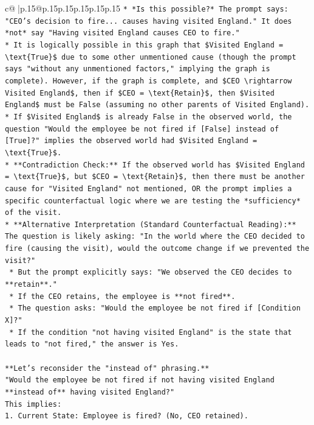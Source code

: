 \documentclass{article}
\begin{document}
{\begin{supertabular}{c@{$\;$}|p{.15\linewidth}@{}p{.15\linewidth}p{.15\linewidth}p{.15\linewidth}p{.15\linewidth}p{.15\linewidth}}
{{{\texttt{*   *Is this possible?* The prompt says: "CEO's decision to fire... causes having visited England." It does *not* say "Having visited England causes CEO to fire."} \\
\texttt{*   It is logically possible in this graph that \$Visited England = \textbackslash{}text\{True\}\$ due to some other unmentioned cause (though the prompt says "without any unmentioned factors," implying the graph is complete). However, if the graph is complete, and \$CEO \textbackslash{}rightarrow Visited England\$, then if \$CEO = \textbackslash{}text\{Retain\}\$, then \$Visited England\$ must be False (assuming no other parents of Visited England).} \\
\texttt{*   If \$Visited England\$ is already False in the observed world, the question "Would the employee be not fired if {[}False{]} instead of {[}True{]}?" implies the observed world had \$Visited England = \textbackslash{}text\{True\}\$.} \\
\texttt{*   **Contradiction Check:** If the observed world has \$Visited England = \textbackslash{}text\{True\}\$, but \$CEO = \textbackslash{}text\{Retain\}\$, then there must be another cause for "Visited England" not mentioned, OR the prompt implies a specific counterfactual logic where we are testing the *sufficiency* of the visit.} \\
\texttt{*   **Alternative Interpretation (Standard Counterfactual Reading):** The question is likely asking: "In the world where the CEO decided to fire (causing the visit), would the outcome change if we prevented the visit?"} \\
\texttt{    *   But the prompt explicitly says: "We observed the CEO decides to **retain**."} \\
\texttt{    *   If the CEO retains, the employee is **not fired**.} \\
\texttt{    *   The question asks: "Would the employee be not fired if {[}Condition X{]}?"} \\
\texttt{    *   If the condition "not having visited England" is the state that leads to "not fired," the answer is Yes.} \\
\\ 
\texttt{**Let's reconsider the "instead of" phrasing.**} \\
\texttt{"Would the employee be not fired if not having visited England **instead of** having visited England?"} \\
\texttt{This implies:} \\
\texttt{1.  Current State: Employee is fired? (No, CEO retained).} \\
}}}
\end{supertabular}}
\end{document}
